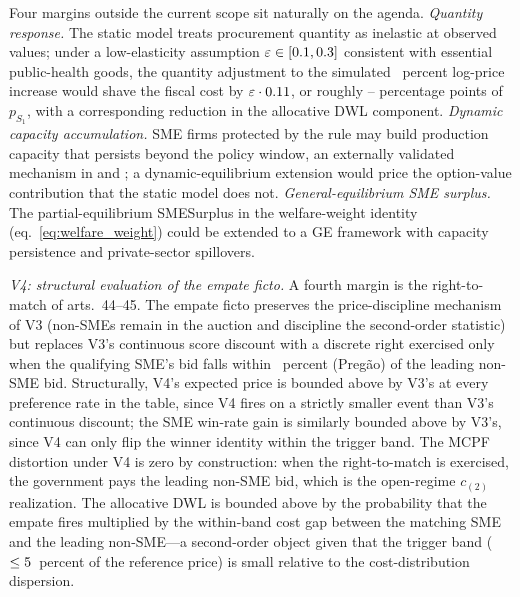 Four margins outside the current scope sit naturally on the agenda. \emph{Quantity response.} The static model treats procurement quantity as inelastic at observed values; under a low-elasticity assumption $\varepsilon \in [0.1, 0.3]$ consistent with essential public-health goods, the quantity adjustment to the simulated \didUpperPct~percent log-price increase would shave the fiscal cost by $\varepsilon \cdot 0.11$, or roughly \ppShavedLo--\ppShavedHi{} percentage points of $p_{S_1}$, with a corresponding reduction in the allocative DWL component. \emph{Dynamic capacity accumulation.} SME firms protected by the rule may build production capacity that persists beyond the policy window, an externally validated mechanism in \citet{ferraz2016} and \citet{szerman2023}; a dynamic-equilibrium extension would price the option-value contribution that the static model does not. \emph{General-equilibrium SME surplus.} The partial-equilibrium SMESurplus in the welfare-weight identity (eq.~\ref{eq:welfare_weight}) could be extended to a GE framework with capacity persistence and private-sector spillovers.

\emph{V4: structural evaluation of the empate ficto.} A fourth margin is the right-to-match of \LCSmeStatute{} arts.~44--45. The empate ficto preserves the price-discipline mechanism of V3 (non-SMEs remain in the auction and discipline the second-order statistic) but replaces V3's continuous score discount with a discrete right exercised only when the qualifying SME's bid falls within \empateBand~percent (Preg\~ao) of the leading non-SME bid. Structurally, V4's expected price is bounded above by V3's at every preference rate in the table, since V4 fires on a strictly smaller event than V3's continuous discount; the SME win-rate gain is similarly bounded above by V3's, since V4 can only flip the winner identity within the trigger band. The MCPF distortion under V4 is zero by construction: when the right-to-match is exercised, the government pays the leading non-SME bid, which is the open-regime $c_{(2)}$ realization. The allocative DWL is bounded above by the probability that the empate fires multiplied by the within-band cost gap between the matching SME and the leading non-SME---a second-order object given that the trigger band ($\le 5$~percent of the reference price) is small relative to the cost-distribution dispersion.

